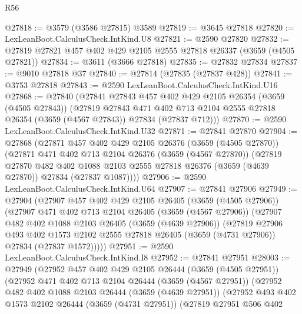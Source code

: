 \begin{lexlean}{R56}
\begin{coremodule}
@27818 := @3579 (@3586 @27815) @3589
@27819 := @3645 @27818
@27820 := LexLeanBoot.CalculusCheck.IntKind.U8
@27821 := @2590 @27820
@27832 := @27819 @27821 @457 @402 @429 @2105 @2555 @27818 @26337 (@3659 (@4505 @27821))
@27834 := @3611 (@3666 @27818)
@27835 := @27832 @27834
@27837 := @9010 @27818 @37
@27840 := @27814 (@27835 (@27837 @428))
@27841 := @3753 @27818
@27843 := @2590 LexLeanBoot.CalculusCheck.IntKind.U16
@27868 := @27840
    (@27841
      @27843
      @457
      @402
      @429
      @2105
      @26354
      (@3659 (@4505 @27843))
      (@27819
        @27843
        @471
        @402
        @713
        @2104
        @2555
        @27818
        @26354
        (@3659 (@4567 @27843))
        @27834
        (@27837 @712)))
@27870 := @2590 LexLeanBoot.CalculusCheck.IntKind.U32
@27871 := @27841 @27870
@27904 := @27868
    (@27871
      @457
      @402
      @429
      @2105
      @26376
      (@3659 (@4505 @27870))
      (@27871
        @471
        @402
        @713
        @2104
        @26376
        (@3659 (@4567 @27870))
        (@27819
          @27870
          @482
          @402
          @1088
          @2103
          @2555
          @27818
          @26376
          (@3659 (@4639 @27870))
          @27834
          (@27837 @1087))))
@27906 := @2590 LexLeanBoot.CalculusCheck.IntKind.U64
@27907 := @27841 @27906
@27949 := @27904
    (@27907
      @457
      @402
      @429
      @2105
      @26405
      (@3659 (@4505 @27906))
      (@27907
        @471
        @402
        @713
        @2104
        @26405
        (@3659 (@4567 @27906))
        (@27907
          @482
          @402
          @1088
          @2103
          @26405
          (@3659 (@4639 @27906))
          (@27819
            @27906
            @493
            @402
            @1573
            @2102
            @2555
            @27818
            @26405
            (@3659 (@4731 @27906))
            @27834
            (@27837 @1572)))))
@27951 := @2590 LexLeanBoot.CalculusCheck.IntKind.I8
@27952 := @27841 @27951
@28003 := @27949
    (@27952
      @457
      @402
      @429
      @2105
      @26444
      (@3659 (@4505 @27951))
      (@27952
        @471
        @402
        @713
        @2104
        @26444
        (@3659 (@4567 @27951))
        (@27952
          @482
          @402
          @1088
          @2103
          @26444
          (@3659 (@4639 @27951))
          (@27952
            @493
            @402
            @1573
            @2102
            @26444
            (@3659 (@4731 @27951))
            (@27819
              @27951
              @506
              @402

\end{coremodule}
\end{lexlean}
